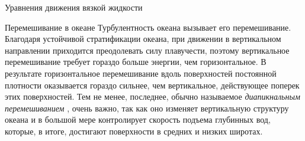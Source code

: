 \begin{chapter}{Уравнения движения вязкой жидкости}
\begin{section}{Перемешивание в океане}\label{sec:MixingInOcean}
 
Турбулентность океана вызывает его перемешивание. Благодаря устойчивой 
стратификации океана, при движении в вертикальном направлении приходится
преодолевать силу плавучести, поэтому вертикальное 
перемешивание требует гораздо больше энергии, чем горизонтальное. В результате
горизонтальное перемешивание вдоль поверхностей постоянной плотности 
оказывается гораздо сильнее, чем вертикальное, действующее поперек этих 
поверхностей. Тем не менее, последнее, обычно называемое 
\emph{диапикнальным перемешиванием}%
, очень важно, так как оно
изменяет вертикальную структуру океана и в большой мере контролирует
скорость подъема глубинных вод, которые, в итоге, достигают
поверхности в средних и низких широтах.
%


\end{section}
\end{chapter}
